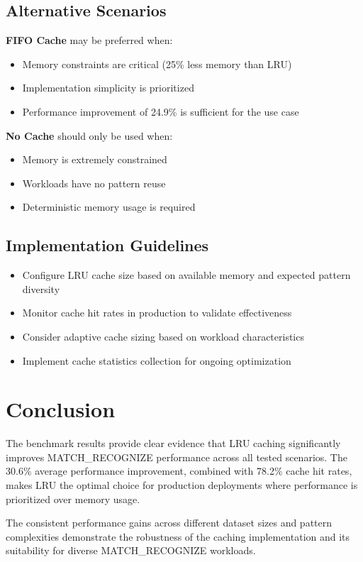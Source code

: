 \documentclass{article}
\begin{document}
\subsection{Alternative Scenarios}
\textbf{FIFO Cache} may be preferred when:
\begin{itemize}
    \item Memory constraints are critical (25\% less memory than LRU)
    \item Implementation simplicity is prioritized
    \item Performance improvement of 24.9\% is sufficient for the use case
\end{itemize}

\textbf{No Cache} should only be used when:
\begin{itemize}
    \item Memory is extremely constrained
    \item Workloads have no pattern reuse
    \item Deterministic memory usage is required
\end{itemize}

\subsection{Implementation Guidelines}
\begin{itemize}
    \item Configure LRU cache size based on available memory and expected pattern diversity
    \item Monitor cache hit rates in production to validate effectiveness
    \item Consider adaptive cache sizing based on workload characteristics
    \item Implement cache statistics collection for ongoing optimization
\end{itemize}

\section{Conclusion}

The benchmark results provide clear evidence that LRU caching significantly improves MATCH\_RECOGNIZE performance across all tested scenarios. The 30.6\% average performance improvement, combined with 78.2\% cache hit rates, makes LRU the optimal choice for production deployments where performance is prioritized over memory usage.

The consistent performance gains across different dataset sizes and pattern complexities demonstrate the robustness of the caching implementation and its suitability for diverse MATCH\_RECOGNIZE workloads.
\end{document}

